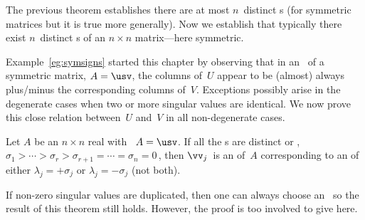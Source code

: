 The previous theorem establishes there are at most \(n\)~distinct s (for symmetric matrices but it is true more generally).  
Now we establish that typically there exist \(n\)~distinct s of an \(n\times n\) matrix---here symmetric.

\begin{comment}
The problem case of repeated singular values and repeated eigenvalues appears to be not adequately dealt with by any first textbook.
\pooliv{p.294} discusses algebraic and geometric {multiplicity}, but best left for eigenproblem of general matrices, if necessary.
\end{comment}



Example~\ref{eg:symsigns} started this chapter by observing that in an \svd\ of a symmetric matrix, \(A=\usv\), the columns of~\(U\) appear to be (almost) always plus\slash minus the corresponding columns of~\(V\).
Exceptions possibly arise in the degenerate cases when two or more singular values are identical.
We now prove this close relation between~\(U\) and~\(V\) in all non-degenerate cases.


\begin{theorem} \label{thm:smevec}
Let \(A\) be an \(n\times n\) real  with \svd\ \(A=\usv\).
If all the s are distinct or , \(\sigma_1>\cdots>\sigma_r>\sigma_{r+1}=\cdots=\sigma_n=0\)\,, then \(\vv_j\)~is an  of~\(A\) corresponding to an  of either \(\lambda_j=+\sigma_j\) or \(\lambda_j=-\sigma_j\) (not both).
\end{theorem}

If non-zero singular values are duplicated, then one can always choose an \svd\ so the result of this theorem still holds.
However, the proof is too involved to give here.

